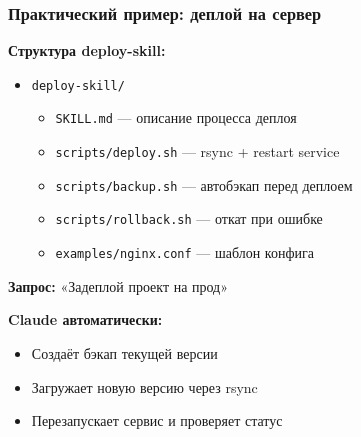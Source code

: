 \documentclass[aspectratio=169]{beamer}
\begin{document}

\begin{frame}
\frametitle{Практический пример: деплой на сервер}

\textbf{Структура deploy-skill:}

\vspace{0.3cm}

\begin{itemize}
    \item \texttt{deploy-skill/}
    \begin{itemize}
        \item \texttt{SKILL.md} — описание процесса деплоя
        \item \texttt{scripts/deploy.sh} — rsync + restart service
        \item \texttt{scripts/backup.sh} — автобэкап перед деплоем
        \item \texttt{scripts/rollback.sh} — откат при ошибке
        \item \texttt{examples/nginx.conf} — шаблон конфига
    \end{itemize}
\end{itemize}

\vspace{0.5cm}

\textbf{Запрос:} «Задеплой проект на прод»

\textbf{Claude автоматически:}
\begin{itemize}
    \item Создаёт бэкап текущей версии
    \item Загружает новую версию через rsync
    \item Перезапускает сервис и проверяет статус
\end{itemize}

\end{frame}

\end{document}

